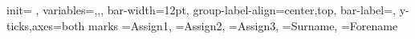 \documentclass[12pt]{article}
\begin{document}
\DTLmultibarchart
{
 init={
  \renewcommand{\DTLbaratendtikz}{%
    \node[at={(\DTLbarchartwidth,0pt)},anchor=south west] 
    {\begin{tabular}{l}
      {\DTLdobarcolor{1}\rule{\DTLbarwidth}{\DTLbarwidth}}
      Assignment 1\\
      {\DTLdobarcolor{2}\rule{\DTLbarwidth}{\DTLbarwidth}}
      Assignment 2\\
      {\DTLdobarcolor{3}\rule{\DTLbarwidth}{\DTLbarwidth}}
      Assignment 3
      \end{tabular}};
    }
  },
 variables={\assignI,\assignII,\assignIII},
 bar-width=12pt,
 group-label-align={center,top},
 bar-label={\xDTLinitials{\Forename}\xDTLinitials{\Surname}},
 y-ticks,axes=both
}
{marks}%
{
 \assignI=Assign1,
 \assignII=Assign2,
 \assignIII=Assign3,
 \Surname=Surname,
 \Forename=Forename
} 
\end{document}
